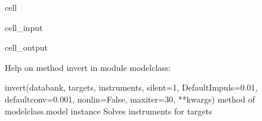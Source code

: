 \documentclass[letterpaper,10pt,english]{jupyterBook}
\begin{document}
\begin{sphinxuseclass}{cell}\begin{sphinxVerbatimInput}

\begin{sphinxuseclass}{cell_input}
\begin{sphinxVerbatim}[commandchars=\\\{\}]
\end{sphinxVerbatim}

\end{sphinxuseclass}\end{sphinxVerbatimInput}
\begin{sphinxVerbatimOutput}

\begin{sphinxuseclass}{cell_output}
\begin{sphinxVerbatim}[commandchars=\\\{\}]
Help on method invert in module modelclass:

invert(databank, targets, instruments, silent=1, DefaultImpuls=0.01, defaultconv=0.001, nonlin=False, maxiter=30, **kwargs) method of modelclass.model instance
    Solves instruments for targets
\end{sphinxVerbatim}

\end{sphinxuseclass}\end{sphinxVerbatimOutput}

\end{sphinxuseclass}
\end{document}
